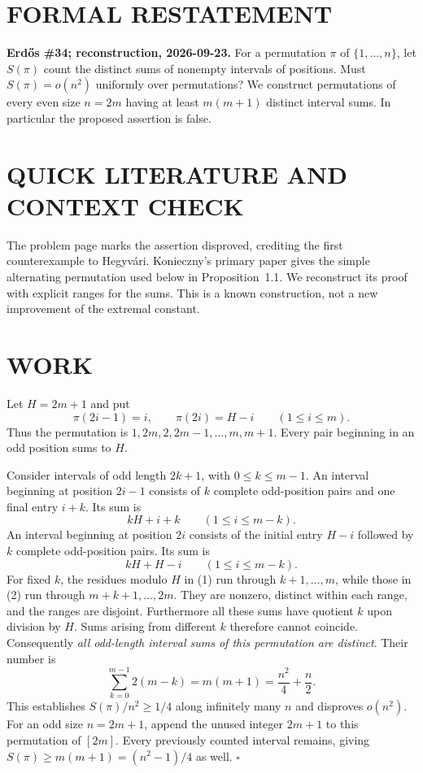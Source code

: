 \section{FORMAL RESTATEMENT}
\textbf{Erd\H{o}s \#34; reconstruction, 2026-09-23.}
For a permutation $\pi$ of $\{1,\ldots,n\}$, let $S(\pi)$ count the
distinct sums of nonempty intervals of positions. Must $S(\pi)=o(n^2)$
uniformly over permutations? We construct permutations of every even
size $n=2m$ having at least $m(m+1)$ distinct interval sums. In particular
the proposed assertion is false.

\section{QUICK LITERATURE AND CONTEXT CHECK}
The problem page marks the assertion disproved, crediting the first
counterexample to Hegyv\'ari. Konieczny's primary paper gives the simple
alternating permutation used below in Proposition~1.1. We reconstruct
its proof with explicit ranges for the sums. This is a known construction,
not a new improvement of the extremal constant.

\section{WORK}
Let $H=2m+1$ and put
\[
 \pi(2i-1)=i,\qquad \pi(2i)=H-i\qquad(1\leq i\leq m).
\]
Thus the permutation is $1,2m,2,2m-1,\ldots,m,m+1$.
Every pair beginning in an odd position sums to $H$.

Consider intervals of odd length $2k+1$, with $0\leq k\leq m-1$.
An interval beginning at position $2i-1$ consists of $k$ complete
odd-position pairs and one final entry $i+k$. Its sum is
\[
 kH+i+k\qquad(1\leq i\leq m-k).                     \tag{1}
\]
An interval beginning at position $2i$ consists of the initial entry
$H-i$ followed by $k$ complete odd-position pairs. Its sum is
\[
 kH+H-i\qquad(1\leq i\leq m-k).                     \tag{2}
\]
For fixed $k$, the residues modulo $H$ in (1) run through
$k+1,\ldots,m$, while those in (2) run through $m+k+1,\ldots,2m$.
They are nonzero, distinct within each range, and the ranges are disjoint.
Furthermore all these sums have quotient $k$ upon division by $H$.
Sums arising from different $k$ therefore cannot coincide. Consequently
\emph{all odd-length interval sums of this permutation are distinct}.
Their number is
\[
 \sum_{k=0}^{m-1}2(m-k)=m(m+1)=\frac{n^2}{4}+\frac n2.
\]
This establishes $S(\pi)/n^2\geq1/4$ along infinitely many $n$ and
disproves $o(n^2)$. For an odd size $n=2m+1$, append the unused integer
$2m+1$ to this permutation of $[2m]$. Every previously counted interval
remains, giving $S(\pi)\geq m(m+1)=(n^2-1)/4$ as well.
\hfill$\square$

